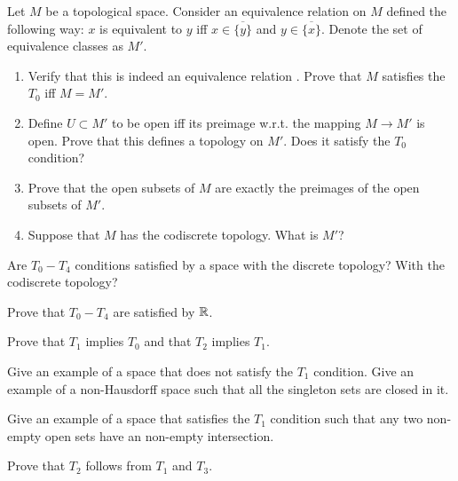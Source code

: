 \documentclass[12pt]{article}
\begin{document}
\begin{zadacha} Let $M$ be a topological space. Consider an
  equivalence relation on $M$ defined the following way: $x$ is
  equivalent to $y$ iff $x \in \overline{\{y\}}$ and $y \in
  \overline{\{x\}}$. Denote the set of equivalence classes as $M'$.
\begin{enumerate}
\item Verify that this is indeed an equivalence relation .
Prove that $M$ satisfies the $T_0$ iff $M=M'$.

\item Define $U \subset M'$ to be open iff its preimage w.r.t. the 
  mapping $M \to M'$ is open. Prove that this defines a topology on
  $M'$. Does it satisfy the $T_0$ condition?

\item Prove that the open subsets of $M$ are exactly the preimages of the open
  subsets of $M'$.

\item Suppose that $M$ has the codiscrete topology. What is $M'$?
\end{enumerate}
\end{zadacha}

\begin{zadacha}
Are $T_0-T_4$ conditions satisfied by a space with the discrete topology?
With the codiscrete topology?
\end{zadacha}

\begin{zadacha}
Prove that $T_0-T_4$ are satisfied by ${\mathbb R}$.
\end{zadacha}

\begin{zadacha}
Prove that $T_1$ implies $T_0$ and that $T_2$ implies $T_1$.
\end{zadacha}

\begin{zadacha} 
Give an example of a space that does not satisfy the $T_1$
condition. Give an example of a non-Hausdorff space such that all
the singleton sets are closed in it.
\end{zadacha}

\begin{zadacha}[*]
Give an example of a space that satisfies the $T_1$ condition such
that any two non-empty open sets have an non-empty intersection.
\end{zadacha}

\begin{zadacha}[*]
Prove that $T_2$ follows from $T_1$ and $T_3$.
\end{zadacha}
\end{document}
